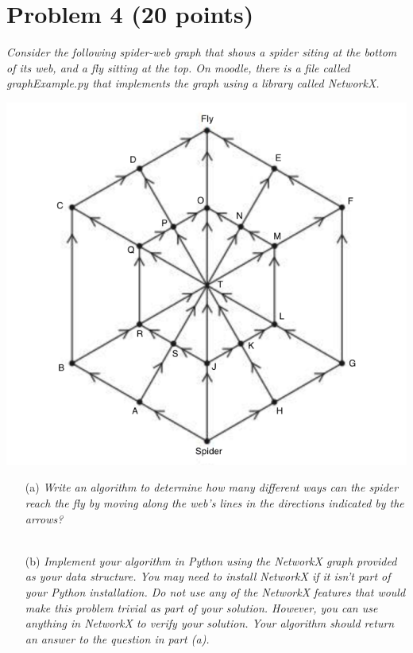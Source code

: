 \documentclass[12pt]{article}
\begin{document}
{\section*{{\selectfont Problem 4 (20 points)}}\vspace{-10mm}
\textsl{Consider the following spider-web graph that shows a spider siting at the bottom of its web, and a fly sitting at the top. On moodle, there is a file called graphExample.py that implements the graph using a library called NetworkX.}
\begin{center}
  \includegraphics[scale=0.4]{Web.png}
\end{center}
\begin{enumerate}
\item[(a)]\textsl{Write an algorithm to determine how many different ways can the spider reach the fly by moving along the web’s lines in the directions indicated by the arrows?}\\ \\
\item[(b)]\textsl{Implement your algorithm in Python using the NetworkX graph provided as your data structure. You may need to install NetworkX if it isn’t part of your Python installation. Do not use any of the NetworkX features that would make this problem trivial as part of your solution. However, you can use anything in NetworkX to verify your solution. Your algorithm should return an answer to the question in part (a).}\\ \\
\end{enumerate}

}
\end{document}
